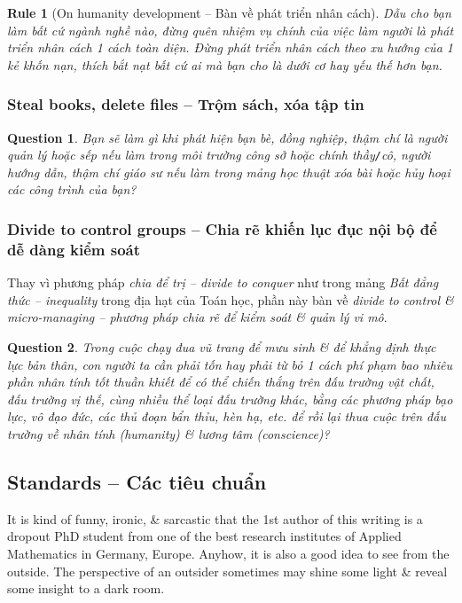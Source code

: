 \documentclass[12pt]{article}
\newtheorem{question}{Question}
\newtheorem{Rule}{Rule}
\begin{document}
\begin{Rule}[On humanity development -- Bàn về phát triển nhân cách]
	Dẫu cho bạn làm bất cứ ngành nghề nào, đừng quên nhiệm vụ chính của việc làm người là phát triển nhân cách 1 cách toàn diện. Đừng phát triển nhân cách theo xu hướng của 1 kẻ khốn nạn, thích bắt nạt bất cứ ai mà bạn cho là dưới cơ hay yếu thế hơn bạn.
\end{Rule}

\subsubsection{Steal books, delete files -- Trộm sách, xóa tập tin}

\begin{question}
	Bạn sẽ làm gì khi phát hiện bạn bè, đồng nghiệp, thậm chí là người quản lý hoặc sếp nếu làm trong môi trường công sở hoặc chính thầy{\tt/}cô, người hướng dẫn, thậm chí giáo sư nếu làm trong mảng học thuật xóa bài hoặc hủy hoại các công trình của bạn?
\end{question}

\subsubsection{Divide to control groups -- Chia rẽ khiến lục đục nội bộ để dễ dàng kiểm soát}
Thay vì phương pháp {\it chia để trị -- divide to conquer} như trong mảng {\it Bất đẳng thức -- inequality} trong địa hạt của Toán học, phần này bàn về {\it divide to control \& micro-managing -- phương pháp chia rẽ để kiểm soát \& quản lý vi mô}.

\begin{question}
	Trong cuộc chạy đua vũ trang để mưu sinh \& để khẳng định thực lực bản thân, con người ta cần phải tốn hay phải từ bỏ 1 cách phí phạm bao nhiêu phần nhân tính tốt thuần khiết để có thể chiến thắng trên đấu trường vật chất, đấu trường vị thế, cùng nhiều thể loại đấu trường khác, bằng các phương pháp bạo lực, vô đạo đức, các thủ đoạn bẩn thỉu, hèn hạ, etc. để rồi lại thua cuộc trên đấu trường về nhân tính (humanity) \& lương tâm (conscience)?
\end{question}

\subsection{Standards -- Các tiêu chuẩn}
It is kind of funny, ironic, \& sarcastic that the 1st author of this writing is a dropout PhD student from one of the best research institutes of Applied Mathematics in Germany, Europe. Anyhow, it is also a good idea to see from the outside. The perspective of an outsider sometimes may shine some light \& reveal some insight to a dark room.
\end{document}
